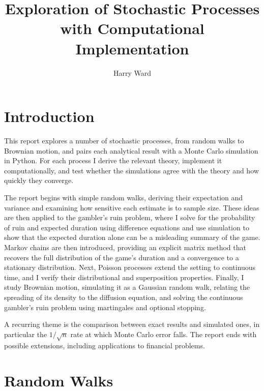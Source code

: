 \documentclass[11pt,a4paper]{article}
\title{Exploration of Stochastic Processes with
Computational Implementation}   %
\author{Harry Ward}  %
\date{}                             %
\begin{document}
\maketitle

\tableofcontents

\newpage

\section{Introduction}

This report explores a number of stochastic processes, from random walks to Brownian motion, and pairs each analytical result with a Monte Carlo simulation in Python. For each process I derive the relevant theory, implement it computationally, and test whether the simulations agree with the theory and how quickly they converge.

The report begins with simple random walks, deriving their expectation and variance and examining how sensitive each estimate is to sample size. These ideas are then applied to the gambler's ruin problem, where I solve for the probability of ruin and expected duration using difference equations and use simulation to show that the expected duration alone can be a misleading summary of the game. Markov chains are then introduced, providing an explicit matrix method that recovers the full distribution of the game's duration and a convergence to a stationary distribution. Next, Poisson processes extend the setting to continuous time, and I verify their distributional and superposition properties. Finally, I study Brownian motion, simulating it as a Gaussian random walk, relating the spreading of its density to the diffusion equation, and solving the continuous gambler's ruin problem using martingales and optional stopping.

A recurring theme is the comparison between exact results and simulated ones, in particular the $1/\sqrt{n}$ rate at which Monte Carlo error falls. The report ends with possible extensions, including applications to financial problems.

\newpage

\section{Random Walks}
\end{document}
